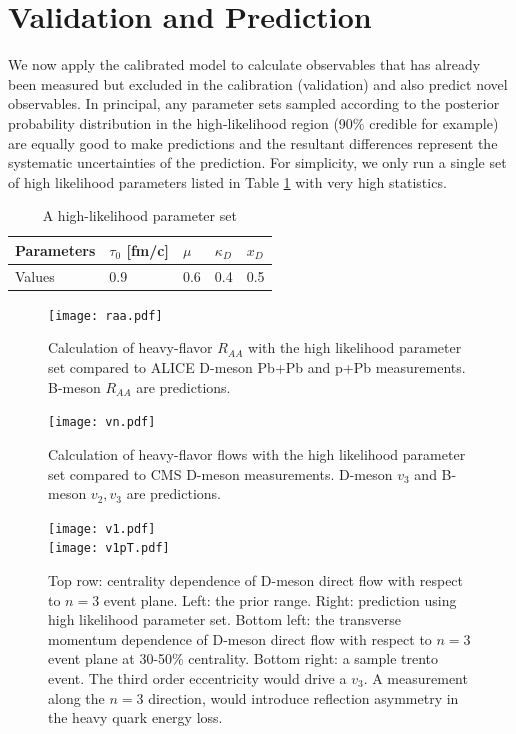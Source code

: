 \documentclass[aps, prc, reprint, amsmath, groupedaddress, nofootinbib]{revtex4-1}
\begin{document}
\section{Validation and Prediction}\label{section:prediction}
We now apply the calibrated model to calculate observables that has already been measured but excluded in the calibration (validation) and also predict novel observables.
In principal, any parameter sets sampled according to the posterior probability distribution in the high-likelihood region (90\% credible for example) are equally good to make predictions and the resultant differences represent the systematic uncertainties of the prediction.
For simplicity, we only run a single set of high likelihood parameters listed in Table \ref{table:high-likelihood-parameters} with very high statistics.
\begin{table}
\caption{A high-likelihood parameter set}\label{table:high-likelihood-parameters}
\begin{tabularx}{\columnwidth}{XXXXX}
\hline
Parameters & $\tau_0$ [fm/c] & $\mu$ & $\kappa_D$ & $x_D$   \\
\hline
Values & 0.9 & 0.6 & 0.4 & 0.5\\
\hline
\end{tabularx}
\end{table} 
\begin{figure}
\texttt{[image: raa.pdf]}
\caption{Calculation of heavy-flavor $R_{AA}$ with the high likelihood parameter set compared to ALICE D-meson Pb+Pb and p+Pb \cite{Abelev:2014hha} measurements. B-meson $R_{AA}$ are predictions.}\label{plots:pred:raa}
\end{figure}
\begin{figure}
\texttt{[image: vn.pdf]}
\caption{Calculation of heavy-flavor flows with the high likelihood parameter set compared to CMS D-meson measurements. D-meson $v_3$ and B-meson $v_2, v_3$ are predictions.}\label{plots:pred:vn}
\end{figure}
\begin{figure}
\texttt{[image: v1.pdf]}\\
\texttt{[image: v1pT.pdf]}
\caption{Top row: centrality dependence of D-meson direct flow with respect to $n=3$ event plane. Left: the prior range. Right: prediction using high likelihood parameter set. Bottom left: the transverse momentum dependence of D-meson direct flow with respect to $n=3$ event plane at 30-50\% centrality. Bottom right: a sample trento event. The third order eccentricity would drive a $v_3$. A measurement along the $n=3$ direction, would introduce reflection asymmetry in the heavy quark energy loss.}\label{plots:pred:v1}
\end{figure}
\end{document}
